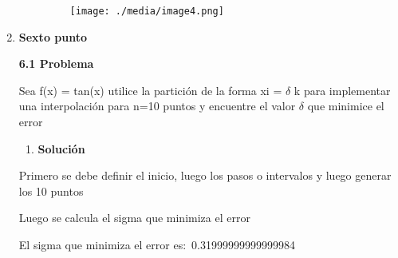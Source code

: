 \documentclass[12pt]{article}
\renewcommand{\_}{\kern-1.5pt\textunderscore\kern-1.5pt}
\begin{document}
\begin{enumerate}[label*={\fontsize{14pt}{14pt}\selectfont \textbf{\arabic*.}}]
\begin{enumerate}[label*={\fontsize{12pt}{12pt}\selectfont \textbf{\arabic*.}}]
\vspace{\baselineskip}



\begin{figure}[H]
	\begin{Center}
		\texttt{[image: ./media/image4.png]}
	\end{Center}
\end{figure}



\par


\vspace{\baselineskip}

\vspace{\baselineskip}

\end{enumerate}
	\item {\fontsize{14pt}{16.8pt}\selectfont \textbf{Sexto punto}\par}\par

\textbf{6.1 Problema}\par

Sea f(x) = tan(x) utilice la partición de la forma xi = $ \delta $ k para implementar una interpolación para n=10 puntos y encuentre el valor $ \delta $  que minimice el error\par


\vspace{\baselineskip}
\begin{enumerate}[label*={\fontsize{12pt}{12pt}\selectfont \arabic*.}]
	\item \textbf{Solución}
\end{enumerate}\par

Primero se debe definir el inicio, luego los pasos o intervalos y luego generar los 10 puntos\par

Luego se calcula el sigma que minimiza el error\par

\begin{adjustwidth}{0.21in}{0.0in}
El sigma que minimiza el error es:\  0.31999999999999984\par

\end{adjustwidth}


\end{enumerate}
\end{document}
